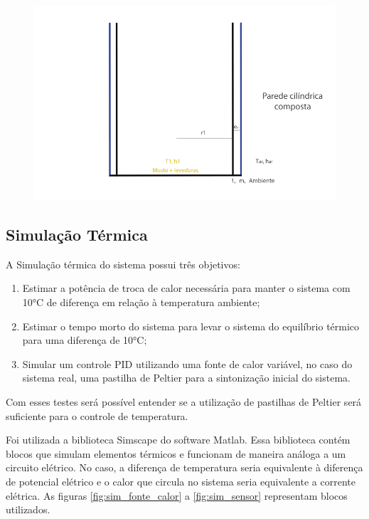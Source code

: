 \begin{figure}[h]
    \centering
    \includegraphics[scale=0.45]{figuras/projeto/controle/fermentador_controle.png}
    \label{fig:fermentador_controle}
\end{figure}



\subsection{Simulação Térmica}

A Simulação térmica do sistema possui três objetivos:

\begin{enumerate}
    \item Estimar a potência de troca de calor necessária para manter o sistema com 10°C de diferença em relação à temperatura ambiente;
    \item Estimar o tempo morto do sistema para levar o sistema do equilíbrio térmico para uma diferença de 10°C;
    \item Simular um controle PID utilizando uma fonte de calor variável, no caso do sistema real, uma pastilha de Peltier para a sintonização inicial do sistema.
\end{enumerate}

Com esses testes será possível entender se a utilização de pastilhas de Peltier será suficiente para o controle de temperatura.


Foi utilizada a biblioteca Simscape do software Matlab. Essa biblioteca contém blocos que simulam elementos térmicos e funcionam de maneira análoga a um circuito elétrico. No caso, a diferença de temperatura seria equivalente à diferença de potencial elétrico e o calor que circula no sistema seria equivalente a corrente elétrica. As figuras \ref{fig:sim_fonte_calor} a \ref{fig:sim_sensor} representam blocos utilizados.


